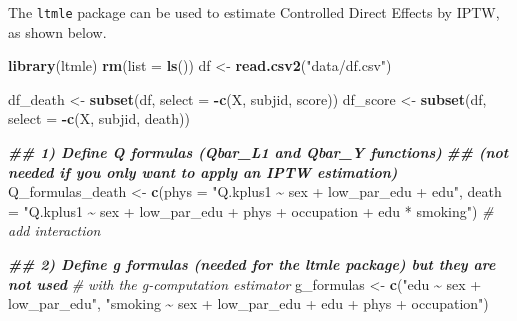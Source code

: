 \documentclass[
]{book}
\newenvironment{Shaded}{\begin{snugshade}}{\end{snugshade}}
\newcommand{\AttributeTok}[1]{\textcolor[rgb]{0.13,0.29,0.53}{#1}}
\newcommand{\CommentTok}[1]{\textcolor[rgb]{0.56,0.35,0.01}{\textit{#1}}}
\newcommand{\DocumentationTok}[1]{\textcolor[rgb]{0.56,0.35,0.01}{\textbf{\textit{#1}}}}
\newcommand{\FunctionTok}[1]{\textcolor[rgb]{0.13,0.29,0.53}{\textbf{#1}}}
\newcommand{\NormalTok}[1]{#1}
\newcommand{\OtherTok}[1]{\textcolor[rgb]{0.56,0.35,0.01}{#1}}
\newcommand{\SpecialCharTok}[1]{\textcolor[rgb]{0.81,0.36,0.00}{\textbf{#1}}}
\newcommand{\StringTok}[1]{\textcolor[rgb]{0.31,0.60,0.02}{#1}}
\begin{document}
The \texttt{ltmle} package can be used to estimate Controlled Direct Effects by IPTW, as shown below.

\begin{Shaded}
\begin{Highlighting}[]
\FunctionTok{library}\NormalTok{(ltmle)}
\FunctionTok{rm}\NormalTok{(}\AttributeTok{list =} \FunctionTok{ls}\NormalTok{())}
\NormalTok{df }\OtherTok{\textless{}{-}} \FunctionTok{read.csv2}\NormalTok{(}\StringTok{"data/df.csv"}\NormalTok{)}

\NormalTok{df\_death }\OtherTok{\textless{}{-}} \FunctionTok{subset}\NormalTok{(df, }\AttributeTok{select =} \SpecialCharTok{{-}}\FunctionTok{c}\NormalTok{(X, subjid, score))}
\NormalTok{df\_score }\OtherTok{\textless{}{-}} \FunctionTok{subset}\NormalTok{(df, }\AttributeTok{select =} \SpecialCharTok{{-}}\FunctionTok{c}\NormalTok{(X, subjid, death))}

\DocumentationTok{\#\# 1) Define Q formulas (Qbar\_L1 and Qbar\_Y functions)}
\DocumentationTok{\#\# (not needed if you only want to apply an IPTW estimation)}
\NormalTok{Q\_formulas\_death }\OtherTok{\textless{}{-}} \FunctionTok{c}\NormalTok{(}\AttributeTok{phys =} \StringTok{"Q.kplus1 \textasciitilde{} sex + low\_par\_edu + edu"}\NormalTok{,}
                      \AttributeTok{death =} \StringTok{"Q.kplus1 \textasciitilde{} sex + low\_par\_edu + phys + occupation +}
\StringTok{                               edu * smoking"}\NormalTok{) }\CommentTok{\# add interaction}

\DocumentationTok{\#\# 2) Define g formulas (needed for the ltmle package) but they are not used}
\CommentTok{\#    with the g{-}computation estimator}
\NormalTok{g\_formulas }\OtherTok{\textless{}{-}} \FunctionTok{c}\NormalTok{(}\StringTok{"edu \textasciitilde{} sex + low\_par\_edu"}\NormalTok{, }
                \StringTok{"smoking \textasciitilde{} sex + low\_par\_edu + edu + phys + occupation"}\NormalTok{)}


\end{Highlighting}
\end{Shaded}
\end{document}
